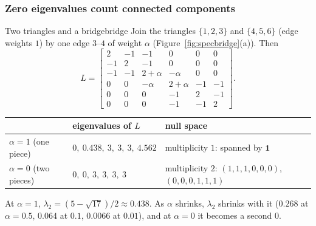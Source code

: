 \documentclass[11pt]{article}
\newcommand{\one}{\symbf{1}}
\begin{document}
\subsubsection*{Zero eigenvalues count connected components}

\begin{example}{Two triangles and a bridge}{bridge}
Join the triangles $\{1,2,3\}$ and $\{4,5,6\}$ (edge weights $1$) by one edge $3$--$4$ of weight $\alpha$ (Figure~\ref{fig:specbridge}(a)). Then
\[
L=\begin{bmatrix}
2&-1&-1&0&0&0\\
-1&2&-1&0&0&0\\
-1&-1&2+\alpha&-\alpha&0&0\\
0&0&-\alpha&2+\alpha&-1&-1\\
0&0&0&-1&2&-1\\
0&0&0&-1&-1&2
\end{bmatrix}.
\]
\begin{center}
\small
\renewcommand{\arraystretch}{1.2}
\begin{tabular}{@{}lll@{}}
\toprule
& eigenvalues of $L$ & null space\\
\midrule
$\alpha=1$ (one piece) & $0,\ 0.438,\ 3,\ 3,\ 3,\ 4.562$ & multiplicity $1$: spanned by $\one$\\
$\alpha=0$ (two pieces) & $0,\ 0,\ 3,\ 3,\ 3,\ 3$ & multiplicity $2$: $(1,1,1,0,0,0)$, $(0,0,0,1,1,1)$\\
\bottomrule
\end{tabular}
\end{center}
At $\alpha=1$, $\lambda_2=(5-\sqrt{17})/2\approx0.438$. As $\alpha$ shrinks, $\lambda_2$ shrinks with it ($0.268$ at $\alpha=0.5$, $0.064$ at $0.1$, $0.0066$ at $0.01$), and at $\alpha=0$ it becomes a second $0$.
\end{example}
\end{document}
